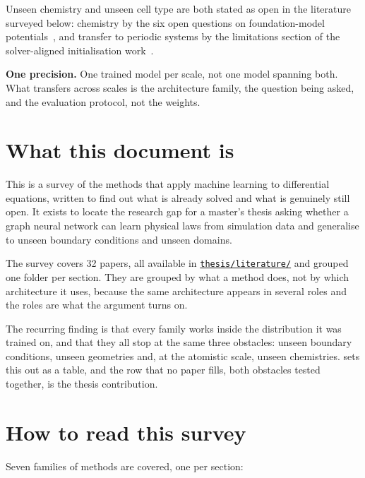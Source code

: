 \documentclass[11pt, a4paper]{article}
\newcommand{\literaturelink}{\href{https://github.com/blockskode/uio-thesis/tree/main/thesis/literature}{\texttt{thesis/literature/}}}
\begin{document}
Unseen chemistry and unseen cell type are both stated as open in the
literature surveyed below: chemistry by the six open questions on
foundation-model potentials~\citep{sixquestions}, and transfer to periodic
systems by the limitations section of the solver-aligned initialisation
work~\citep{sail}.

\textbf{One precision.} One trained model per scale, not one model spanning
both. What transfers across scales is the architecture family, the question
being asked, and the evaluation protocol, not the weights.

\section{What this document is}

This is a survey of the methods that apply machine learning to differential
equations, written to find out what is already solved and what is genuinely
still open. It exists to locate the research gap for a master's thesis asking
whether a graph neural network can learn physical laws from simulation data
and generalise to unseen boundary conditions and unseen domains.

The survey covers 32 papers, all available in \literaturelink{}
and grouped one folder per section. They are grouped by what a method does,
not by which architecture it uses, because the same architecture appears in
several roles and the roles are what the argument turns on.

The recurring finding is that every family works inside the distribution it
was trained on, and that they all stop at the same three obstacles: unseen
boundary conditions, unseen geometries and, at the atomistic scale, unseen
chemistries.  sets this out as a table, and the row that no
paper fills, both obstacles tested together, is the thesis contribution.

\section{How to read this survey}

Seven families of methods are covered, one per section:
\end{document}

